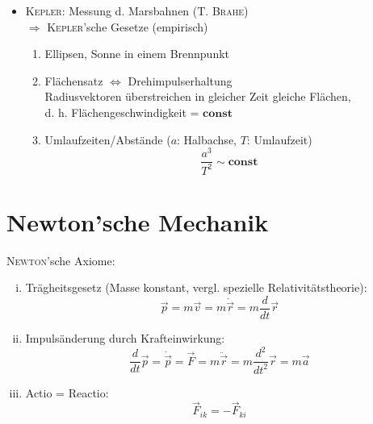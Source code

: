 \begin{itemize}
    \item \textsc{Kepler:} Messung d. Marsbahnen (T. \textsc{Brahe})\\
          $\Rightarrow$ \textsc{Kepler}'sche Gesetze (empirisch)
          \begin{enumerate}
              \item Ellipsen, Sonne in einem Brennpunkt
              \item Flächensatz $\Leftrightarrow$ Drehimpulserhaltung \\
                    Radiusvektoren überstreichen in gleicher Zeit gleiche Flächen,\\
                    d. h. Flächengeschwindigkeit = $\mathbf{const}$
              \item Umlaufzeiten/Abstände ($a$: Halbachse, $T$: Umlaufzeit)
                      \[ \frac{a^3}{T^2} \sim \mathbf{const} \]
          \end{enumerate}
\end{itemize}

\section{Newton'sche Mechanik}
\textsc{Newton}'sche Axiome:
\begin{enumerate}[(i)]
    \item Trägheitsgesetz (Masse konstant, vergl. spezielle Relativitätstheorie):
        \[ \vec p = m \vec v = m \dot{\vec{r}} = m \frac{d}{dt} \vec r \]
    \item Impulsänderung durch Krafteinwirkung:
        \[ \frac{d}{dt} \vec p = \dot{\vec p} = \vec F = m \ddot{\vec r} = m \frac{d^2}{dt^2} \vec r = m \vec a \]
    \item Actio = Reactio:
        \[ \vec F_{ik} = -\vec F_{ki} \]
\end{enumerate}
